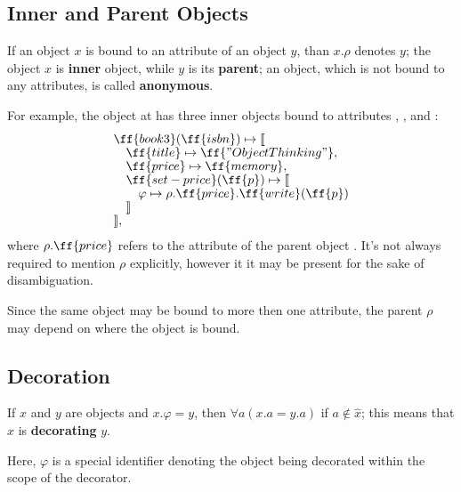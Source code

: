 \subsection{Inner and Parent Objects}

\begin{eodefinition}\label{def:parent}
If an object $x$ is bound to an attribute of
an object $y$, than $x.\rho$ denotes $y$;
the object $x$ is \textbf{inner} object, while $y$ is its \textbf{parent};
an object, which is not bound to any attributes, is called \textbf{anonymous}.
\end{eodefinition}

For example, the object at 
has three inner objects bound to attributes , , and :
\begin{equation}\label{eq:book3}
\begin{split}
& \ff{book3}(\ff{isbn}) \mapsto \llbracket \br
& \quad \ff{title} \mapsto \ff{"Object Thinking"}, \br
& \quad \ff{price} \mapsto \ff{memory}, \br
& \quad \ff{set-price}(\ff{p}) \mapsto \llbracket \br
& \quad \quad \varphi \mapsto \rho.\ff{price}.\ff{write}(\ff{p}) \br
& \quad \rrbracket \br
& \rrbracket, \\
\end{split}
\end{equation}
where $\rho.\ff{price}$ refers to the attribute 
of the parent object . It's not always required to mention
$\rho$ explicitly, however it it may be present for the sake of
disambiguation.

Since the same object may be bound to more then one attribute,
the parent $\rho$ may depend on where the object
is bound.

\subsection{Decoration}

\begin{eodefinition}\label{def:decorator}
If $x$ and $y$ are objects and $x.\varphi = y$, then
  $\forall a (x.a = y.a)$ if $a \not\in \hat{x}$;
  this means that $x$ is \textbf{decorating} $y$.
\end{eodefinition}

Here, $\varphi$ is a special identifier denoting the object being decorated
within the scope of the decorator.

